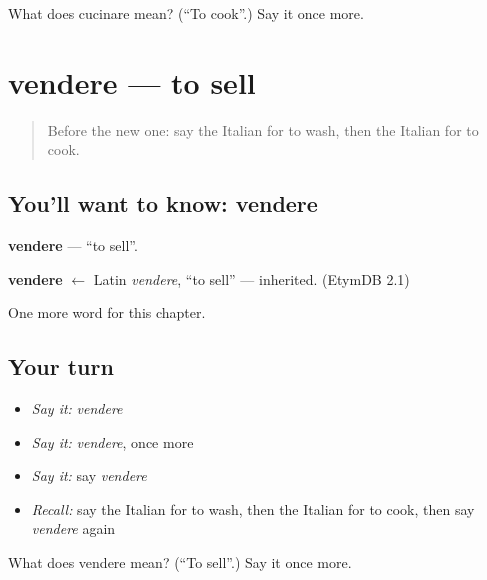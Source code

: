 \begin{tcolorbox}[breakable,colback=teal!4,colframe=teal!35!black,title={Before you move on}]
What does cucinare mean? (\textquotedblleft{}To cook\textquotedblright{}.) Say it once more.
\end{tcolorbox}
\section[vendere]{vendere — to sell}

\label{lesson:IT-C48-vendere}



\begin{quote}
Before the new one: say the Italian for to wash, then the Italian for to cook.
\end{quote}

\subsection*{You'll want to know: vendere}
\textbf{vendere} — \textquotedblleft{}to sell\textquotedblright{}.

\begin{cousinweb}
\textbf{vendere} $\leftarrow$ Latin \emph{vendere}, \textquotedblleft{}to sell\textquotedblright{} — inherited. (EtymDB 2.1)
\end{cousinweb}

\begin{grammarlens}[title={What you've built}]
One more word for this chapter.
\end{grammarlens}

\subsection*{Your turn}
\begin{itemize}
\raggedright
  \item \emph{Say it:} \emph{vendere}
  \item \emph{Say it:} \emph{vendere}, once more
  \item \emph{Say it:} say \emph{vendere}
  \item \emph{Recall:} say the Italian for to wash, then the Italian for to cook, then say \emph{vendere} again
\end{itemize}

\begin{tcolorbox}[breakable,colback=teal!4,colframe=teal!35!black,title={Before you move on}]
What does vendere mean? (\textquotedblleft{}To sell\textquotedblright{}.) Say it once more.
\end{tcolorbox}
